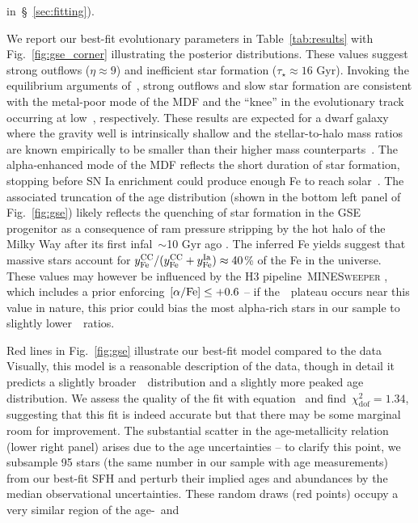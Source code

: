 in~\S~\ref{sec:fitting}).
\par
We report our best-fit evolutionary parameters in Table~\ref{tab:results}
with Fig.~\ref{fig:gse_corner} illustrating the posterior distributions.
These values suggest strong outflows ($\eta \approx 9$) and inefficient star
formation ($\tau_\star \approx 16$ Gyr).
Invoking the equilibrium arguments of~\citet{Weinberg2017b}, strong outflows and
slow star formation are consistent with the metal-poor mode of the MDF and the
``knee'' in the evolutionary track occurring at low~\feh, respectively.
These results are expected for a dwarf galaxy where the gravity well is
intrinsically shallow and the stellar-to-halo mass ratios are known empirically
to be smaller than their higher mass counterparts~\citep{Hudson2015}.
The alpha-enhanced mode of the MDF reflects the short duration of star
formation, stopping before SN Ia enrichment could produce enough Fe to reach
solar~\afe.
The associated truncation of the age distribution (shown in the bottom left
panel of Fig.~\ref{fig:gse}) likely reflects the quenching of star
formation in the GSE progenitor as a consequence of ram pressure stripping by
the hot halo of the Milky Way after its first infal~$\sim$10 Gyr ago
\citep{Bonaca2020}.
The inferred Fe yields suggest that massive stars account for
$y_\text{Fe}^\text{CC} / (y_\text{Fe}^\text{CC} + y_\text{Fe}^\text{Ia}) \approx 40$\% of the Fe in the universe.
These values may however be influenced by the H3 pipeline~\textsc{MINESweeper}
\citep{Cargile2020}, which includes a prior enforcing~$\text{[$\alpha$/Fe]} \leq +0.6$ -- if
the~\afe~plateau occurs near this value in nature, this prior could bias the
most alpha-rich stars in our sample to slightly lower~\afe~ratios.
\par
Red lines in Fig.~\ref{fig:gse} illustrate our best-fit model compared to the
data
Visually, this model is a reasonable description of the data, though in detail
it predicts a slightly broader~\feh~distribution and a slightly more peaked age
distribution.
We assess the quality of the fit with equation~ and
find~$\chi_\text{dof}^2 = 1.34$, suggesting that this fit is indeed accurate
but that there may be some marginal room for improvement.
The substantial scatter in the age-metallicity relation (lower right panel)
arises due to the age uncertainties -- to clarify this point, we subsample 95
stars (the same number in our sample with age measurements) from our best-fit
SFH and perturb their implied ages and abundances by the median observational
uncertainties.
These random draws (red points) occupy a very similar region of the age-\feh~and
